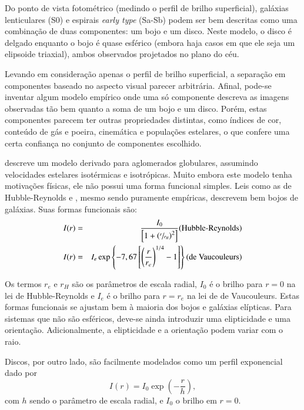 Do ponto de vista fotométrico (medindo o perfil de brilho superficial), galáxias
lenticulares (S0) e espirais {\em early type} (Sa-Sb) podem ser bem descritas
como uma combinação de duas componentes: um bojo e um disco. Neste modelo, o
disco é delgado enquanto o bojo é quase esférico (embora haja casos em que ele
seja um elipsoide triaxial), ambos observados projetados no plano do céu.

Levando em consideração apenas o perfil de brilho superficial, a separação em
componentes baseado no aspecto visual parecer arbitrária. Afinal, pode-se
inventar algum modelo empírico onde uma só componente descreva as imagens
observadas tão bem quanto a soma de um bojo e um disco. Porém, estas componentes
parecem ter outras propriedades distintas, como índices de cor, conteúdo de gás
e poeira, cinemática e populações estelares, o que confere uma certa confiança
no conjunto de componentes escolhido.

\citet{King1966} descreve um modelo derivado para aglomerados globulares,
assumindo velocidades estelares isotérmicas e isotrópicas. Muito embora este
modelo tenha motivações físicas, ele não possui uma forma funcional simples.
Leis como as de Hubble-Reynolds \citep[equação 2.55]{Binney2011} e
\citet{deVaucouleurs1948, deVaucouleurs1977}, mesmo sendo puramente empíricas,
descrevem bem bojos de galáxias. Suas formas funcionais são:
\begin{eqnarray*}
I(r) &=& \frac{I_0}{\left[1 + \left(\sfrac{r}{r_H}\right)^2\right]}
\text{(Hubble-Reynolds)} \\
I(r) &=& I_e \exp \left\{-7,67 \left[\left(\frac{r}{r_e}\right)^{1/4} -
1\right]\right\} \text{(de Vaucouleurs)}
\end{eqnarray*}

Os termos $r_e$ e $r_H$ são os parâmetros de escala radial, $I_0$ é o
brilho para $r\!=\!0$ na lei de Hubble-Reynolds e $I_e$ é o brilho para $r=r_e$
na lei de de Vaucouleurs. Estas formas funcionais se ajustam bem à maioria dos
bojos e galáxias elípticas. Para sistemas que não são esféricos, deve-se ainda
introduzir uma elipticidade e uma orientação. Adicionalmente, a elipticidade e a
orientação podem variar com o raio.

Discos, por outro lado, são facilmente modelados como um perfil exponencial
\citep{Freeman1970} dado por
\begin{equation*}
I(r) = I_0 \exp\left(-\frac{r}{h}\right),
\end{equation*}
com $h$ sendo o parâmetro de escala radial, e $I_0$ o brilho em $r\!=\!0$.


